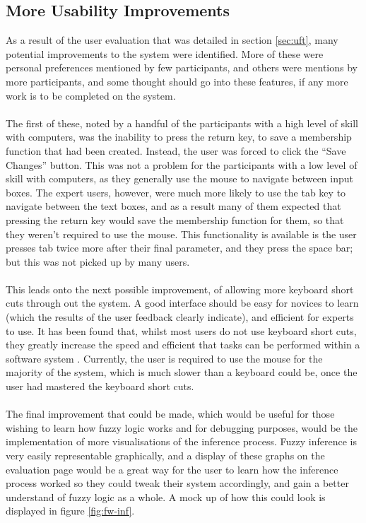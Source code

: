 \subsection{More Usability Improvements}
As a result of the user evaluation that was detailed in section \ref{sec:uft}, many potential improvements to the system were identified. More of these were personal preferences mentioned by few participants, and others were mentions by more participants, and some thought should go into these features, if any more work is to be completed on the system.\ \\
\ \\
The first of these, noted by a handful of the participants with a high level of skill with computers, was the inability to press the return key, to save a membership function that had been created. Instead, the user was forced to click the ``Save Changes'' button. This was not a problem for the participants with a low level of skill with computers, as they generally use the mouse to navigate between input boxes. The expert users, however, were much more likely to use the tab key to navigate between the text boxes, and as a result many of them expected that pressing the return key would save the membership function for them, so that they weren't required to use the mouse. This functionality is available is the user presses tab twice more after their final parameter, and they press the space bar; but this was not picked up by many users. \ \\
\ \\
This leads onto the next possible improvement, of allowing more keyboard short cuts through out the system. A good interface should be easy for novices to learn (which the results of the user feedback clearly indicate), and efficient for experts to use. It has been found that, whilst most users do not use keyboard short cuts, they greatly increase the speed and efficient that tasks can be performed within a software system \cite{lane2005hidden}. Currently, the user is required to use the mouse for the majority of the system, which is much slower than a keyboard could be, once the user had mastered the keyboard short cuts.\ \\
\ \\
The final improvement that could be made, which would be useful for those wishing to learn how fuzzy logic works and for debugging purposes, would be the implementation of more visualisations of the inference process. Fuzzy inference is very easily representable graphically, and a display of these graphs on the evaluation page would be a great way for the user to learn how the inference process worked so they could tweak their system accordingly, and gain a better understand of fuzzy logic as a whole. A mock up of how this could look is displayed in figure \ref{fig:fw-inf}.

